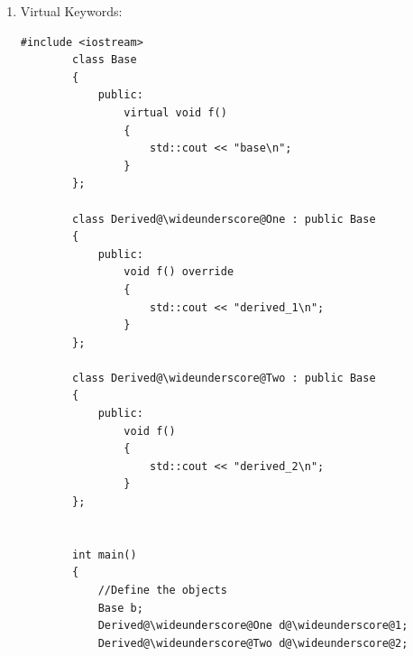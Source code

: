 \documentclass{article}
\newcommand{\wideunderscore}{\underline{\hphantom{n}}}
\begin{document}
\begin{enumerate}[label=(\alph*)]
    Whenever the above code is executed, a memory leak occurs. 
    \textbf{Explain what a memory leak is and come up with one line of code that can be added above to fix the memory leak.}\newline

    \textcolor{blue}{A memory leak is when we forget to free allocated memory or lose access to a region of allocated memory due to a pointer value being changed. We can fix this by revising line 8 as follows:}

    \begin{lstlisting}[style=CStyle]
    company@\wideunderscore@node * the@\wideunderscore@current = gabriel@\wideunderscore@company->company@\wideunderscore@head;
        company@\wideunderscore@node the@\wideunderscore@previous = gabriel@\wideunderscore@company->company@\wideunderscore@head;
        while(the@\wideunderscore@current->next != @\textcolor{blue}{NULL}@  ){
            the@\wideunderscore@current = the@\wideunderscore@current->next;
            free(@\textcolor{blue}{the\wideunderscore previous}@);
            @\textcolor{blue}{the\wideunderscore previous = the\wideunderscore{current} }@; //move previous further
        }
        @\textcolor{blue}{free(the\wideunderscore current)}@;
        free(gabriel@\wideunderscore@company);
    \end{lstlisting}

    
    
    \item Virtual Keywords:
    \begin{lstlisting}[style = CStyle]
        #include <iostream>
        class Base
        {
            public: 
                virtual void f()
                {
                    std::cout << "base\n";
                }
        };

        class Derived@\wideunderscore@One : public Base
        {
            public:
                void f() override
                {
                    std::cout << "derived_1\n";
                }
        };

        class Derived@\wideunderscore@Two : public Base 
        {
            public: 
                void f()
                {
                    std::cout << "derived_2\n";
                }
        };

    
        int main()
        {
            //Define the objects
            Base b;
            Derived@\wideunderscore@One d@\wideunderscore@1;
            Derived@\wideunderscore@Two d@\wideunderscore@2;


\end{lstlisting}
\end{enumerate}
\end{document}
